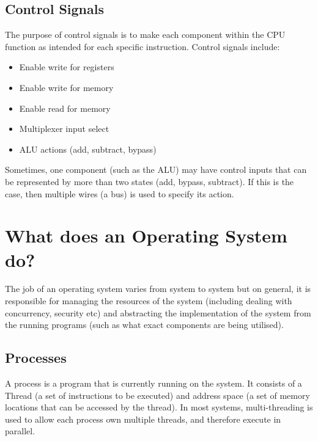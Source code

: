 \subsection{Control Signals}

The purpose of control signals is to make each component within the CPU function
as intended for each specific instruction. Control signals include:

\begin{itemize}
  \item Enable write for registers
  \item Enable write for memory
  \item Enable read for memory
  \item Multiplexer input select
  \item ALU actions (add, subtract, bypass)
\end{itemize}

Sometimes, one component (such as the ALU) may have control inputs that can be
represented by more than two states (add, bypass, subtract). If this is the
case, then multiple wires (a bus) is used to specify its action.


%

\section{What does an Operating System do?}

The job of an operating system varies from system to system but on general, it
is responsible for managing the resources of the system (including dealing with
concurrency, security etc) and abstracting the implementation of the system from
the running programs (such as what exact components are being utilised).

\subsection{Processes}

A process is a program that is currently running on the system. It consists of a
Thread (a set of instructions to be executed) and address space (a set of memory
locations that can be accessed by the thread). In most systems, multi-threading
is used to allow each process own multiple threads, and therefore execute in
parallel.

